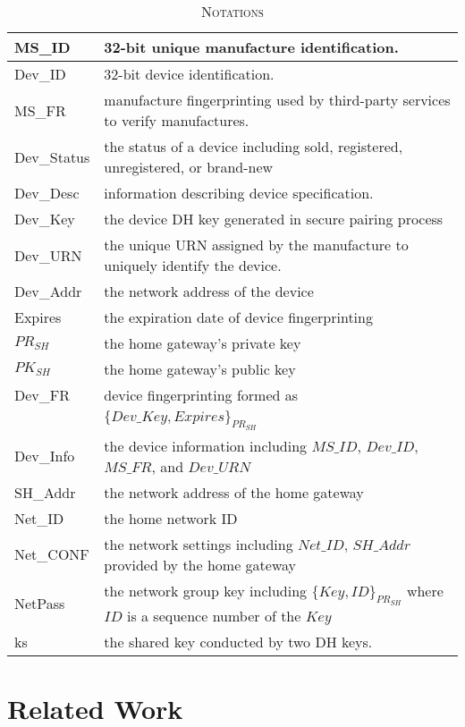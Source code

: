\begin{table}[t]
\centering
\caption{\textsc{Notations}}
\label{notation}
{\small
\begin{tabular}{| l | p{6.5cm} |}
 \hline
MS\_ID & 32-bit unique manufacture identification. \\ \hline
Dev\_ID & 32-bit device identification. \\ \hline
MS\_FR & manufacture fingerprinting used by third-party services to verify manufactures. \\ \hline
Dev\_Status & the status of a device including sold, registered, unregistered, or brand-new \\ \hline
Dev\_Desc & information describing device specification. \\ \hline
Dev\_Key & the device DH key generated in secure pairing process \\ \hline
Dev\_URN & the unique URN assigned by the manufacture to uniquely identify the device. \\ \hline
Dev\_Addr & the network address of the device \\ \hline
Expires & the expiration date of device fingerprinting \\ \hline
$PR_{SH}$ & the home gateway's private key \\ \hline
$PK_{SH}$ & the home gateway's public key \\ \hline 
Dev\_FR & device fingerprinting formed as \\
 & $\{Dev\_Key, Expires\}_{PR_{SH}}$ \\ \hline
Dev\_Info & the device information including $MS\_ID$, $Dev\_ID$, $MS\_FR$, and $Dev\_URN$ \\ \hline 
SH\_Addr & the network address of the home gateway \\ \hline
Net\_ID & the home network ID \\ \hline
Net\_CONF & the network settings including $Net\_ID$, $SH\_Addr$ provided by the home gateway \\ \hline
NetPass & the network group key including $\{Key,ID\}_{PR_{SH}}$ where $ID$ is a sequence number of the $Key$ \\ \hline
ks & the shared key conducted by two DH keys. \\ \hline

\end{tabular}
}
\end{table}

\section{Related Work}\label{buildingblocks}


